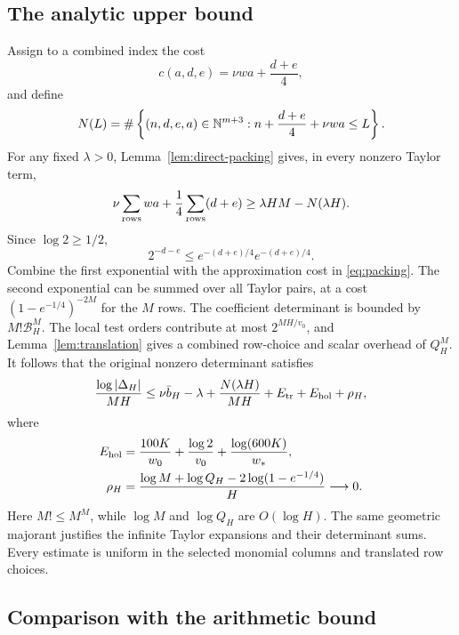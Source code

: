 \subsection{The analytic upper bound}

Assign to a combined index the cost
\[
                         c(a,d,e)=\nu wa+\frac{d+e}{4},
\]
and define
\[
 N(L)=\#\left\{(n,d,e,a)\in\mathbb N^{m+3}:
                  n+\frac{d+e}{4}+\nu wa\leq L\right\}.
\]
For any fixed \(\lambda>0\), Lemma~\ref{lem:direct-packing}
gives, in every nonzero Taylor term,
\begin{equation}\label{eq:packing}
 \nu\sum_{\rm rows}wa+\frac14\sum_{\rm rows}(d+e)
                               \geq\lambda HM-N(\lambda H).
\end{equation}
Since \(\log2\geq1/2\),
\[
                  2^{-d-e}\leq e^{-(d+e)/4}e^{-(d+e)/4}.
\]
Combine the first exponential with the approximation cost in
\eqref{eq:packing}. The second exponential can be summed over all
Taylor pairs, at a cost
\((1-e^{-1/4})^{-2M}\) for the \(M\) rows.
The coefficient determinant is bounded by \(M!\mathcal B_H^M\).
The local test orders contribute at most \(2^{MH/v_0}\), and
Lemma~\ref{lem:translation} gives a combined row-choice and
scalar overhead of \(Q_H^M\).
It follows that the original nonzero determinant satisfies
\begin{equation}\label{eq:direct-analytic}
 \frac{\log|\Delta_H|}{MH}
 \leq\nu\bar b_H-\lambda+\frac{N(\lambda H)}{MH}
                  +E_{\rm tr}+E_{\rm hol}+\rho_H,
\end{equation}
where
\begin{align}
 E_{\rm hol}
   &=\frac{100K}{w_0}+\frac{\log2}{v_0}
                              +\frac{\log(600K)}{w_*},
       \label{eq:hol-error}\\
 \rho_H
   &=\frac{\log M+\log Q_H-2\log(1-e^{-1/4})}{H}
                               \longrightarrow0.
       \label{eq:overhead}
\end{align}
Here \(M!\leq M^M\), while \(\log M\) and \(\log Q_H\) are
\(O(\log H)\). The same geometric majorant justifies the infinite
Taylor expansions and their determinant sums. Every estimate is
uniform in the selected monomial columns and translated row choices.

\subsection{Comparison with the arithmetic bound}

